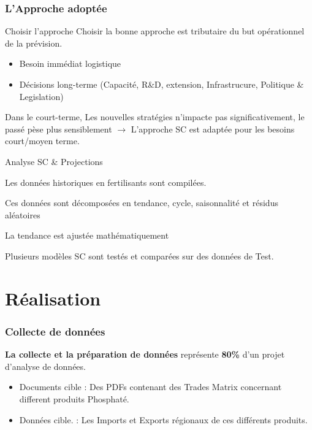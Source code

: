 \documentclass{beamer}
\begin{document}
	\begin{frame}
	\frametitle{L'Approche adoptée}
	
	\begin{block}{Choisir l'approche}
	\scriptsize{Choisir la bonne approche est tributaire du but opérationnel de la prévision.}
	\footnotesize{
	\begin{itemize}
	\item Besoin immédiat logistique
	\item Décisions long-terme (Capacité, R\&D, extension, Infrastrucure, Politique \& Legislation)
	\end{itemize}}
	\scriptsize{Dans le court-terme, Les nouvelles stratégies n'impacte pas significativement, le passé pèse plus sensiblement $\rightarrow$  L'approche SC est adaptée pour les besoins court/moyen terme.}
	\end{block}
	\begin{block}{Analyse SC \& Projections}
	\begin{itemize}
	\scriptsize{\item Les données historiques en fertilisants sont compilées.
	\item Ces données sont décomposées en tendance, cycle, saisonnalité et résidus aléatoires 
	\item La tendance est ajustée mathématiquement 
	\item Plusieurs modèles SC sont testés et comparées sur des données de Test.}
	\end{itemize}
	\end{block}
	\end{frame}

\section{Réalisation}

\begin{frame}
  \frametitle{Collecte de données}
  \textbf{La collecte et la préparation de données} représente \textbf{80\%} d'un projet d'analyse de données.\\
  \begin{itemize}
    \item Documents cible : Des PDFs contenant des Trades Matrix concernant different produits Phosphaté.
    \item Données cible. : Les Imports et Exports régionaux de ces différents produits.
  \end{itemize}
\end{frame}
\end{document}
